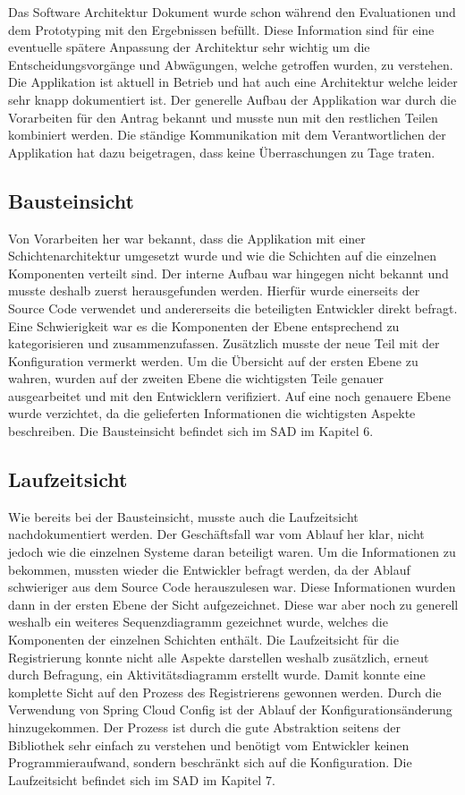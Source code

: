 Das Software Architektur Dokument wurde schon während den Evaluationen und dem Prototyping mit den Ergebnissen befüllt. Diese Information sind für eine eventuelle spätere Anpassung der Architektur sehr wichtig um die Entscheidungsvorgänge und Abwägungen, welche getroffen wurden, zu verstehen. Die Applikation ist aktuell in Betrieb und hat auch eine Architektur welche leider sehr knapp dokumentiert ist. Der generelle Aufbau der Applikation war durch die Vorarbeiten für den Antrag bekannt und musste nun mit den restlichen Teilen kombiniert werden. Die ständige Kommunikation mit dem Verantwortlichen der Applikation hat dazu beigetragen, dass keine Überraschungen zu Tage traten.

\subsection{Bausteinsicht}

Von Vorarbeiten her war bekannt, dass die Applikation mit einer Schichtenarchitektur umgesetzt wurde und wie die Schichten auf die einzelnen Komponenten verteilt sind. Der interne Aufbau war hingegen nicht bekannt und musste deshalb zuerst herausgefunden werden. Hierfür wurde einerseits der Source Code verwendet und andererseits die beteiligten Entwickler direkt befragt. Eine Schwierigkeit war es die Komponenten der Ebene entsprechend zu kategorisieren und zusammenzufassen. Zusätzlich musste der neue Teil mit der Konfiguration vermerkt werden. Um die Übersicht auf der ersten Ebene zu wahren, wurden auf der zweiten Ebene die wichtigsten Teile genauer ausgearbeitet und mit den Entwicklern verifiziert. Auf eine noch genauere Ebene wurde verzichtet, da die gelieferten Informationen die wichtigsten Aspekte beschreiben. Die Bausteinsicht befindet sich im SAD im Kapitel 6.

\subsection{Laufzeitsicht}

Wie bereits bei der Bausteinsicht, musste auch die Laufzeitsicht nachdokumentiert werden. Der Geschäftsfall war vom Ablauf her klar, nicht jedoch wie die einzelnen Systeme daran beteiligt waren. Um die Informationen zu bekommen, mussten wieder die Entwickler befragt werden, da der Ablauf schwieriger aus dem Source Code herauszulesen war. Diese Informationen wurden dann in der ersten Ebene der Sicht aufgezeichnet. Diese war aber noch zu generell weshalb ein weiteres Sequenzdiagramm gezeichnet wurde, welches die Komponenten der einzelnen Schichten enthält. Die Laufzeitsicht für die Registrierung konnte nicht alle Aspekte darstellen weshalb zusätzlich, erneut durch Befragung, ein Aktivitätsdiagramm erstellt wurde. Damit konnte eine komplette Sicht auf den Prozess des Registrierens gewonnen werden.\newline\newline
Durch die Verwendung von Spring Cloud Config ist der Ablauf der Konfigurationsänderung hinzugekommen. Der Prozess ist durch die gute Abstraktion seitens der Bibliothek sehr einfach zu verstehen und benötigt vom Entwickler keinen Programmieraufwand, sondern beschränkt sich auf die Konfiguration. Die Laufzeitsicht befindet sich im SAD im Kapitel 7.

